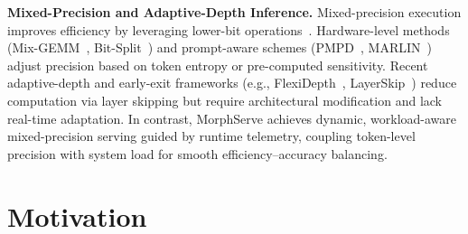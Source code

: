 \documentclass{article}
\newcommand{\system}{{MorphServe}\xspace}
\begin{document}
\noindent\textbf{{Mixed-Precision and Adaptive-Depth Inference.}}
Mixed-precision execution improves efficiency by leveraging lower-bit operations~\cite{reggiani2023mix_precision, huang2021mixed_precision, wang2020towards_bitsplit, chen2024progressive_quant, frantar2025marlin_mixed_precision, dong2019hawq_mixed_precision, risso2022channel_mixed_precision}. 
Hardware-level methods (Mix-GEMM~\cite{reggiani2023mix_precision}, Bit-Split~\cite{wang2020towards_bitsplit}) and prompt-aware schemes (PMPD~\cite{chen2024progressive_quant}, MARLIN~\cite{frantar2025marlin_mixed_precision}) adjust precision based on token entropy or pre-computed sensitivity. 
{Recent adaptive-depth and early-exit frameworks (e.g., FlexiDepth~\cite{luo2025adaptive}, LayerSkip~\cite{Elhoushi_2024}) reduce computation via layer skipping but require architectural modification and lack real-time adaptation.} 
{In contrast, {\system} achieves dynamic, workload-aware mixed-precision serving guided by runtime telemetry, coupling token-level precision with system load for smooth efficiency--accuracy balancing.}

\section{Motivation}
\label{sec:motivation}
\end{document}
